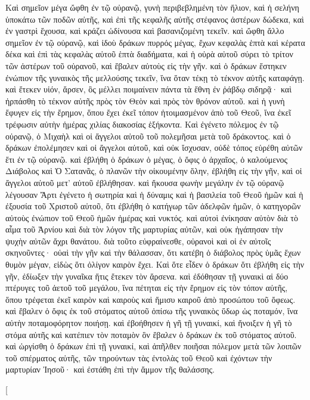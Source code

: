 \begin{pages}
    \begin{Rightside}
        \beginnumbering
		Καὶ σημεῖον μέγα ὤφθη ἐν τῷ οὐρανῷ, γυνὴ περιβεβλημένη τὸν ἥλιον, καὶ ἡ σελήνη ὑποκάτω τῶν ποδῶν αὐτῆς, καὶ ἐπὶ τῆς κεφαλῆς αὐτῆς στέφανος ἀστέρων δώδεκα, καὶ ἐν γαστρὶ ἔχουσα, καὶ κράζει ὠδίνουσα καὶ βασανιζομένη τεκεῖν. 
		\pend
		\pstart
		καὶ ὤφθη ἄλλο σημεῖον ἐν τῷ οὐρανῷ, καὶ ἰδοὺ δράκων πυρρός μέγας, ἔχων κεφαλὰς ἑπτὰ καὶ κέρατα δέκα καὶ ἐπὶ τὰς κεφαλὰς αὐτοῦ ἑπτὰ διαδήματα, καὶ ἡ οὐρὰ αὐτοῦ σύρει τὸ τρίτον τῶν ἀστέρων τοῦ οὐρανοῦ, καὶ ἔβαλεν αὐτοὺς εἰς τὴν γῆν. καὶ ὁ δράκων ἕστηκεν ἐνώπιον τῆς γυναικὸς τῆς μελλούσης τεκεῖν, ἵνα ὅταν τέκῃ τὸ τέκνον αὐτῆς καταφάγῃ. καὶ ἔτεκεν υἱόν, ἄρσεν, ὃς μέλλει ποιμαίνειν πάντα τὰ ἔθνη ἐν ῥάβδῳ σιδηρᾷ· καὶ ἡρπάσθη τὸ τέκνον αὐτῆς πρὸς τὸν Θεὸν καὶ πρὸς τὸν θρόνον αὐτοῦ. 
		\pend
		\pstart
		καὶ ἡ γυνὴ ἔφυγεν εἰς τὴν ἔρημον, ὅπου ἔχει ἐκεῖ τόπον ἡτοιμασμένον ἀπὸ τοῦ Θεοῦ, ἵνα ἐκεῖ τρέφωσιν αὐτὴν ἡμέρας χιλίας διακοσίας ἑξήκοντα. Καὶ ἐγένετο πόλεμος ἐν τῷ οὐρανῷ, ὁ Μιχαὴλ καὶ οἱ ἄγγελοι αὐτοῦ τοῦ πολεμῆσαι μετὰ τοῦ δράκοντος. καὶ ὁ δράκων ἐπολέμησεν καὶ οἱ ἄγγελοι αὐτοῦ, καὶ οὐκ ἴσχυσαν, οὐδὲ τόπος εὑρέθη αὐτῶν ἔτι ἐν τῷ οὐρανῷ. 
		\pend
		\pstart
		καὶ ἐβλήθη ὁ δράκων ὁ μέγας, ὁ ὄφις ὁ ἀρχαῖος, ὁ καλούμενος Διάβολος καὶ Ὁ Σατανᾶς, ὁ πλανῶν τὴν οἰκουμένην ὅλην, ἐβλήθη εἰς τὴν γῆν, καὶ οἱ ἄγγελοι αὐτοῦ μετ’ αὐτοῦ ἐβλήθησαν. καὶ ἤκουσα φωνὴν μεγάλην ἐν τῷ οὐρανῷ λέγουσαν Ἄρτι ἐγένετο ἡ σωτηρία καὶ ἡ δύναμις καὶ ἡ βασιλεία τοῦ Θεοῦ ἡμῶν καὶ ἡ ἐξουσία τοῦ 	Χριστοῦ αὐτοῦ, ὅτι ἐβλήθη ὁ κατήγωρ τῶν ἀδελφῶν ἡμῶν, ὁ κατηγορῶν αὐτοὺς ἐνώπιον τοῦ Θεοῦ ἡμῶν ἡμέρας καὶ νυκτός. 
		\pend
		\pstart
		καὶ αὐτοὶ ἐνίκησαν αὐτὸν διὰ τὸ αἷμα τοῦ Ἀρνίου καὶ διὰ τὸν λόγον τῆς μαρτυρίας αὐτῶν, καὶ οὐκ ἠγάπησαν τὴν ψυχὴν αὐτῶν ἄχρι θανάτου. διὰ τοῦτο εὐφραίνεσθε, οὐρανοὶ καὶ οἱ ἐν αὐτοῖς σκηνοῦντες· οὐαὶ τὴν γῆν καὶ τὴν θάλασσαν, ὅτι κατέβη ὁ διάβολος πρὸς ὑμᾶς ἔχων θυμὸν μέγαν, εἰδὼς ὅτι ὀλίγον καιρὸν ἔχει.
		\pend
		\pstart
		Καὶ ὅτε εἶδεν ὁ δράκων ὅτι ἐβλήθη εἰς τὴν γῆν, ἐδίωξεν τὴν γυναῖκα ἥτις ἔτεκεν τὸν ἄρσενα. καὶ ἐδόθησαν τῇ γυναικὶ αἱ δύο πτέρυγες τοῦ ἀετοῦ τοῦ μεγάλου, ἵνα πέτηται εἰς τὴν ἔρημον εἰς τὸν τόπον αὐτῆς, ὅπου τρέφεται ἐκεῖ καιρὸν καὶ καιροὺς καὶ ἥμισυ καιροῦ ἀπὸ προσώπου τοῦ ὄφεως. 
		\pend
		\pstart
		καὶ ἔβαλεν ὁ ὄφις ἐκ τοῦ στόματος αὐτοῦ ὀπίσω τῆς γυναικὸς ὕδωρ ὡς ποταμόν, ἵνα αὐτὴν ποταμοφόρητον ποιήσῃ. καὶ ἐβοήθησεν ἡ γῆ τῇ γυναικί, καὶ ἤνοιξεν ἡ γῆ τὸ στόμα αὐτῆς καὶ κατέπιεν τὸν ποταμὸν ὃν ἔβαλεν ὁ δράκων ἐκ τοῦ στόματος αὐτοῦ. 
		\pend
		\pstart
		καὶ ὠργίσθη ὁ δράκων ἐπὶ τῇ γυναικί, καὶ ἀπῆλθεν ποιῆσαι πόλεμον μετὰ τῶν λοιπῶν τοῦ σπέρματος αὐτῆς, τῶν τηρούντων τὰς ἐντολὰς τοῦ Θεοῦ καὶ ἐχόντων τὴν μαρτυρίαν Ἰησοῦ· καὶ ἐστάθη ἐπὶ τὴν ἄμμον τῆς θαλάσσης.	
		\pend
        \endnumbering
    \end{Rightside}
    \begin{Leftside}
        \beginnumbering
        \pstart[

\end{Leftside}
\end{pages}
